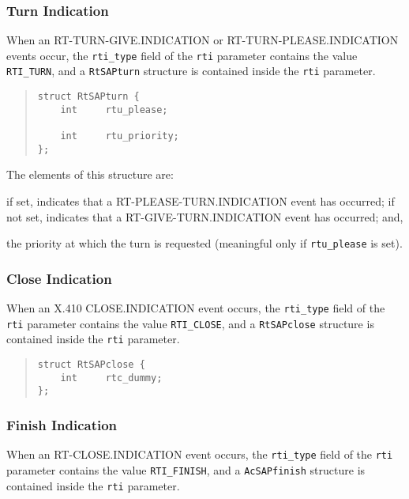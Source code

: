 \subsubsection	{Turn Indication}
When an {\sf RT-TURN-GIVE.INDICATION\/} or {\sf RT-TURN-PLEASE.INDICATION\/}
events occur,
the \verb"rti_type" field of the \verb"rti" parameter contains the value
\verb"RTI_TURN",
and a \verb"RtSAPturn" structure is contained inside the \verb"rti"
parameter.
\begin{quote}\small\begin{verbatim}
struct RtSAPturn {
    int     rtu_please;

    int     rtu_priority;
};
\end{verbatim}\end{quote}
The elements of this structure are:
\begin{describe}
\item[\verb"rtu\_please":] if set, indicates that a
{\sf RT-PLEASE-TURN.INDICATION\/} event has occurred;
if not set,
indicates that a {\sf RT-GIVE-TURN.IN\-DI\-CA\-TION\/} event has occurred;
and,

\item[\verb"rtu\_priority":] the priority at which the turn is requested
(meaningful only if \verb"rtu_please" is set).
\end{describe}

\subsubsection	{Close Indication}
When an {\sf X.410 CLOSE.INDICATION\/} event occurs,
the \verb"rti_type" field of the \verb"rti" parameter contains the value
\verb"RTI_CLOSE",
and a \verb"RtSAPclose" structure is contained inside the \verb"rti"
parameter.
\begin{quote}\small\begin{verbatim}
struct RtSAPclose {
    int     rtc_dummy;
};
\end{verbatim}\end{quote}

\subsubsection	{Finish Indication}
When an {\sf RT-CLOSE.INDICATION\/} event occurs,
the \verb"rti_type" field of the \verb"rti" parameter contains the value
\verb"RTI_FINISH",
and a \verb"AcSAPfinish" structure is contained inside the \verb"rti"
parameter.

